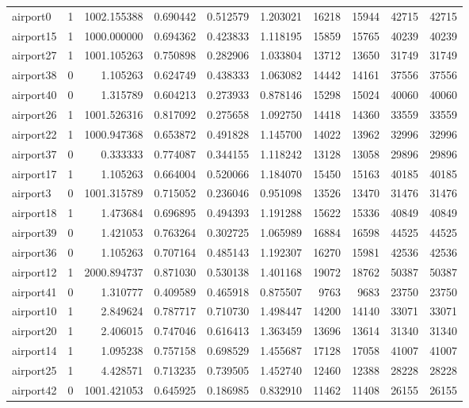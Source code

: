 \begin{longtable}{|l|r|r|r|r|r|r|r|r|r|}
airport0 & 1 & 1002.155388 & 0.690442 & 0.512579 & 1.203021 & 16218 & 15944 & 42715 & 42715 \\
airport15 & 1 & 1000.000000 & 0.694362 & 0.423833 & 1.118195 & 15859 & 15765 & 40239 & 40239 \\
airport27 & 1 & 1001.105263 & 0.750898 & 0.282906 & 1.033804 & 13712 & 13650 & 31749 & 31749 \\
airport38 & 0 & 1.105263 & 0.624749 & 0.438333 & 1.063082 & 14442 & 14161 & 37556 & 37556 \\
airport40 & 0 & 1.315789 & 0.604213 & 0.273933 & 0.878146 & 15298 & 15024 & 40060 & 40060 \\
airport26 & 1 & 1001.526316 & 0.817092 & 0.275658 & 1.092750 & 14418 & 14360 & 33559 & 33559 \\
airport22 & 1 & 1000.947368 & 0.653872 & 0.491828 & 1.145700 & 14022 & 13962 & 32996 & 32996 \\
airport37 & 0 & 0.333333 & 0.774087 & 0.344155 & 1.118242 & 13128 & 13058 & 29896 & 29896 \\
airport17 & 1 & 1.105263 & 0.664004 & 0.520066 & 1.184070 & 15450 & 15163 & 40185 & 40185 \\
airport3 & 0 & 1001.315789 & 0.715052 & 0.236046 & 0.951098 & 13526 & 13470 & 31476 & 31476 \\
airport18 & 1 & 1.473684 & 0.696895 & 0.494393 & 1.191288 & 15622 & 15336 & 40849 & 40849 \\
airport39 & 0 & 1.421053 & 0.763264 & 0.302725 & 1.065989 & 16884 & 16598 & 44525 & 44525 \\
airport36 & 0 & 1.105263 & 0.707164 & 0.485143 & 1.192307 & 16270 & 15981 & 42536 & 42536 \\
airport12 & 1 & 2000.894737 & 0.871030 & 0.530138 & 1.401168 & 19072 & 18762 & 50387 & 50387 \\
airport41 & 0 & 1.310777 & 0.409589 & 0.465918 & 0.875507 & 9763 & 9683 & 23750 & 23750 \\
airport10 & 1 & 2.849624 & 0.787717 & 0.710730 & 1.498447 & 14200 & 14140 & 33071 & 33071 \\
airport20 & 1 & 2.406015 & 0.747046 & 0.616413 & 1.363459 & 13696 & 13614 & 31340 & 31340 \\
airport14 & 1 & 1.095238 & 0.757158 & 0.698529 & 1.455687 & 17128 & 17058 & 41007 & 41007 \\
airport25 & 1 & 4.428571 & 0.713235 & 0.739505 & 1.452740 & 12460 & 12388 & 28228 & 28228 \\
airport42 & 0 & 1001.421053 & 0.645925 & 0.186985 & 0.832910 & 11462 & 11408 & 26155 & 26155 \\

\end{longtable}
